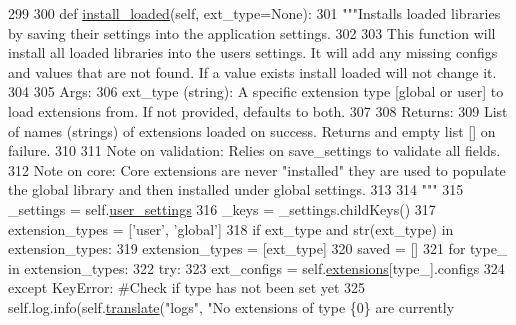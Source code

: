 \begin{DoxyCode}
299 
300     \textcolor{keyword}{def }\hyperlink{classcommotion__client_1_1utils_1_1extension__manager_1_1ExtensionManager_a58bcb83cefe458d4affcb185785694c6}{install\_loaded}(self, ext\_type=None):
301         \textcolor{stringliteral}{"""Installs loaded libraries by saving their settings into the application settings.}
302 \textcolor{stringliteral}{}
303 \textcolor{stringliteral}{        This function will install all loaded libraries into the users settings. It will add any missing
       configs and values that are not found. If a value exists install loaded will not change it.}
304 \textcolor{stringliteral}{        }
305 \textcolor{stringliteral}{        Args:}
306 \textcolor{stringliteral}{          ext\_type (string): A specific extension type [global or user] to load extensions from. If not
       provided, defaults to both.}
307 \textcolor{stringliteral}{}
308 \textcolor{stringliteral}{        Returns:}
309 \textcolor{stringliteral}{          List of names (strings) of extensions loaded  on success. Returns and empty list [] on failure.}
310 \textcolor{stringliteral}{        }
311 \textcolor{stringliteral}{        Note on validation: Relies on save\_settings to validate all fields.}
312 \textcolor{stringliteral}{        Note on core: Core extensions are never "installed" they are used to populate the global library
       and then installed under global settings.}
313 \textcolor{stringliteral}{        }
314 \textcolor{stringliteral}{        """}
315         \_settings = self.\hyperlink{classcommotion__client_1_1utils_1_1extension__manager_1_1ExtensionManager_a0fa8b2be1171ded73629a01c50472d34}{user\_settings}
316         \_keys = \_settings.childKeys()
317         extension\_types = [\textcolor{stringliteral}{'user'}, \textcolor{stringliteral}{'global'}]
318         \textcolor{keywordflow}{if} ext\_type \textcolor{keywordflow}{and} str(ext\_type) \textcolor{keywordflow}{in} extension\_types:
319             extension\_types = [ext\_type]
320         saved = []
321         \textcolor{keywordflow}{for} type\_ \textcolor{keywordflow}{in} extension\_types:
322             \textcolor{keywordflow}{try}:
323                 ext\_configs = self.\hyperlink{classcommotion__client_1_1utils_1_1extension__manager_1_1ExtensionManager_ab11d3e09be6db88eb58e432c82d82702}{extensions}[type\_].configs
324             \textcolor{keywordflow}{except} KeyError: \textcolor{comment}{#Check if type has not been set yet}
325                 self.log.info(self.\hyperlink{classcommotion__client_1_1utils_1_1extension__manager_1_1ExtensionManager_a2cfd032ca383c3fd6f0f52b99b6dd67c}{translate}(\textcolor{stringliteral}{"logs"}, \textcolor{stringliteral}{"No extensions of type \{0\} are currently
}
\end{DoxyCode}
